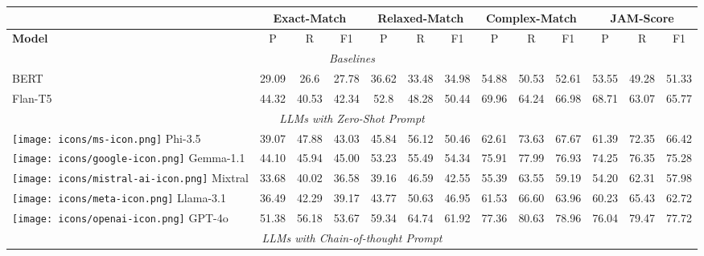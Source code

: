 \begin{table*}[h!]
\small
\centering
\renewcommand*{\arraystretch}{1}

\begin{tabular}{l|ccc|ccc|ccc|ccc}
 & \multicolumn{3}{c}{\textbf{Exact-Match}}& \multicolumn{3}{c}{\textbf{Relaxed-Match}} & \multicolumn{3}{c}{\textbf{Complex-Match}}& \multicolumn{3}{c}{\textbf{JAM-Score}} \\
\midrule
\textbf{Model}& P & R & F1 & P & R & F1  & P & R & F1 & P & R & F1\\
\midrule

\multicolumn{13}{c}{\textit{Baselines }}\\
\midrule
BERT & 29.09 & 26.6 & 27.78 & 36.62 & 33.48 & 34.98 & 54.88 & 50.53 & 52.61 & 53.55 & 49.28 & 51.33 \\

Flan-T5 & 44.32 & 40.53 & 42.34 & 52.8 & 48.28 & 50.44 & 69.96 & 64.24 & 66.98 & 68.71 & 63.07 & 65.77 \\

\midrule
\multicolumn{13}{c}{\textit{LLMs with Zero-Shot Prompt}}\\
\midrule

\texttt{[image: icons/ms-icon.png]} Phi-3.5 & 39.07 & 47.88 & 43.03 & 45.84 & 56.12 & 50.46 & 62.61 & 73.63 & 67.67 & 61.39 & 72.35 & 66.42\\
\texttt{[image: icons/google-icon.png]} Gemma-1.1 & 44.10 & 45.94 & 45.00 & 53.23 & 55.49 & 54.34 & 75.91 & 77.99 & 76.93 & 74.25 & 76.35 & 75.28\\
\texttt{[image: icons/mistral-ai-icon.png]} Mixtral & 33.68 & 40.02 & 36.58 & 39.16 & 46.59 & 42.55 & 55.39 & 63.55 & 59.19 & 54.20 & 62.31 & 57.98 \\
\texttt{[image: icons/meta-icon.png]} Llama-3.1 & 36.49 & 42.29 & 39.17 & 43.77 & 50.63 & 46.95 & 61.53 & 66.60 & 63.96 & 60.23 & 65.43 & 62.72 \\
\texttt{[image: icons/openai-icon.png]} GPT-4o & 51.38 & 56.18 & 53.67 & 59.34 & 64.74 & 61.92 & 77.36 & 80.63 & 78.96 & 76.04 & 79.47 & 77.72 \\

\midrule
\multicolumn{13}{c}{\textit{LLMs with Chain-of-thought Prompt}}\\
\midrule


\end{tabular}
\end{table*}
